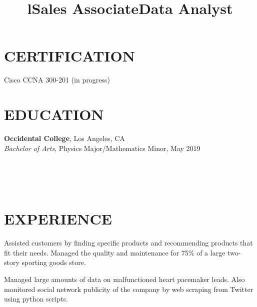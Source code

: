 \documentclass[margin]{res}
\begin{document}
\begin{resume}

	\section{CERTIFICATION}
	Cisco CCNA 300-201 (in progress)


\section{EDUCATION}
\textbf{Occidental College}, Los Angeles, CA\\
{\sl Bachelor of Arts}, Physics Major/Mathematics Minor, May 2019\hfill 


\begin{format}
\title{l}\\
\\
\body\\
\end{format}

\section{EXPERIENCE}
\title{\textbf{Sales Associate}}
\begin{position}
	Assisted customers by finding specific products and recommending products that fit their needs. Managed the quality and maintenance for 75\% of a large two-story sporting goods store.	
\end{position}

\title{\textbf{Data Analyst}}
\begin{position}
	Managed large amounts of data on malfunctioned heart pacemaker leads. Also monitored social network publicity of the company by web scraping from Twitter using python scripts.
\end{position}


\end{resume}
\end{document}
